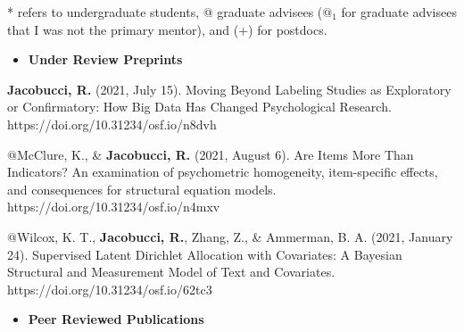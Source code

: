 \documentclass[letterpaper,10pt]{article}
\begin{document}
* refers to undergraduate students, @ graduate advisees ($@_{1}$ for graduate advisees that I was not the primary mentor), and (+) for postdocs.
\begin{itemize} 
	\setlength{\topsep}{0pt}%
	\setlength{\leftmargin}{0.1in}%
	\setlength{\listparindent}{-0.1in}%
	\setlength{\itemindent}{-0.2in}%
	\setlength{\parsep}{\parskip}%
	
	\item {\textbf{\large{Under Review Preprints}}}
\end{itemize}
\begin{etaremune}
\item \textbf{Jacobucci, R.} (2021, July 15). Moving Beyond Labeling Studies as Exploratory or Confirmatory: How Big Data Has Changed Psychological Research. https://doi.org/10.31234/osf.io/n8dvh

\item $@$McClure, K., \& \textbf{Jacobucci, R.} (2021, August 6). Are Items More Than Indicators? An examination of psychometric homogeneity, item-specific effects, and consequences for structural equation models. https://doi.org/10.31234/osf.io/n4mxv

\item $@$Wilcox, K. T., \textbf{Jacobucci, R.}, Zhang, Z., \& Ammerman, B. A. (2021, January 24). Supervised Latent Dirichlet Allocation with Covariates: A Bayesian Structural and Measurement Model of Text and Covariates. https://doi.org/10.31234/osf.io/62tc3

	
	\end{etaremune}
\vspace{3mm}
\begin{itemize}
	\item {\textbf{\large{Peer Reviewed Publications}}}
\end{itemize}
\end{document}
